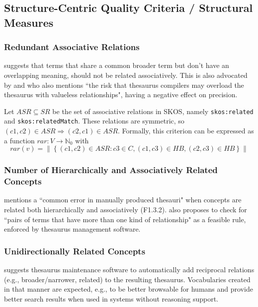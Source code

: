 \subsection{Structure-Centric Quality Criteria / Structural Measures}

\subsubsection{Redundant Associative Relations} \cite{ISO25964-1:2011} suggests that terms that share a common broader term but don’t have an overlapping meaning, should not be related associatively. This is also advocated by \cite{Hedden2010} and \cite{Aitchison2000} who also mentions ``the risk that thesaurus compilers may overload the thesaurus with valueless relationships", having a negative effect on precision.

\begin{definition}
Let \(ASR \subseteq SR\) be the set of associative relations in SKOS, namely \texttt{skos:related} and \texttt{skos:relatedMatch}. These relations are symmetric, so \((c1,c2) \in ASR \Rightarrow (c2,c1) \in ASR\). Formally, this criterion can be expressed as a function \(rar:V \rightarrow \mathbb{N}_{0}\) with \[rar(v)=\left\|\left\{(c1,c2) \in ASR : c3 \in C, (c1,c3) \in HB, (c2,c3) \in HB\right\}\right\|\]
\end{definition}

\subsubsection{Number of Hierarchically and Associatively Related Concepts}\label{harc} \cite{Aitchison2000} mentions a ``common error in manually produced thesauri" when concepts are related both hierarchically and associatively (F1.3.2). \cite{Hedden2010} also proposes to check for ``pairs of terms that have more than one kind of relationship" as a feasible rule, enforced by thesaurus management software.


\subsubsection{Unidirectionally Related Concepts} \cite{Z39.19:2005} suggests thesaurus maintenance software to automatically add reciprocal relations (e.g., broader/narrower, related) to the resulting thesaurus. Vocabularies created in that manner are expected, e.g., to be better browsable for humans and provide better search results when used in systems without reasoning support.

